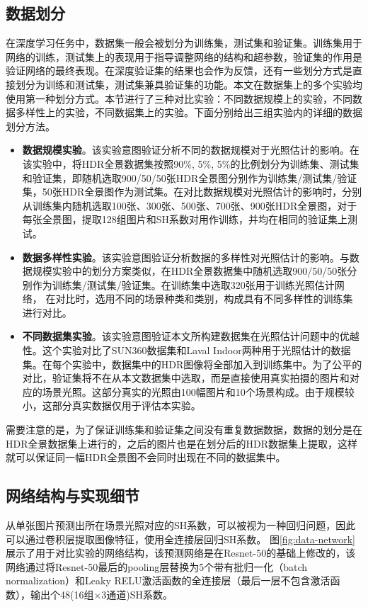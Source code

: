 \subsection{数据划分}
在深度学习任务中，数据集一般会被划分为训练集，测试集和验证集。训练集用于网络的训练，测试集上的表现用于指导调整网络的结构和超参数，验证集的作用是验证网络的最终表现。在深度验证集的结果也会作为反馈，还有一些划分方式是直接划分为训练和测试集，测试集兼具验证集的功能。本文在数据集上的多个实验均使用第一种划分方式。本节进行了三种对比实验：不同数据规模上的实验，不同数据多样性上的实验，不同数据集上的实验。下面分别给出三组实验内的详细的数据划分方法。
\begin{itemize}
    \item \textbf{数据规模实验}。该实验意图验证分析不同的数据规模对于光照估计的影响。在该实验中，将HDR全景数据集按照90\%, 5\%, 5\%的比例划分为训练集、测试集和验证集，即随机选取900/50/50张HDR全景图分别作为训练集/测试集/验证集，50张HDR全景图作为测试集。在对比数据规模对光照估计的影响时，分别从训练集内随机选取100张、300张、500张、700张、900张HDR全景图，对于每张全景图，提取128组图片和SH系数对用作训练，并均在相同的验证集上测试。
    \item \textbf{数据多样性实验}。该实验意图验证分析数据的多样性对光照估计的影响。与数据规模实验中的划分方案类似，在HDR全景数据集中随机选取900/50/50张分别作为训练集/测试集/验证集。在训练集中选取320张用于训练光照估计网络， 在对比时，选用不同的场景种类和类别，构成具有不同多样性的训练集进行对比。
    \item \textbf{不同数据集实验}。该实验意图验证本文所构建数据集在光照估计问题中的优越性。这个实验对比了SUN360\cite{xiao2012recognizing}数据集和Laval Indoor\cite{gardner2017learning}两种用于光照估计的数据集。在每个实验中，数据集中的HDR图像将全部加入到训练集中。为了公平的对比，验证集将不在从本文数据集中选取，而是直接使用真实拍摄的图片和对应的场景光照。这部分真实的光照由100幅图片和10个场景构成。由于规模较小，这部分真实数据仅用于评估本实验。
\end{itemize}

需要注意的是，为了保证训练集和验证集之间没有重复数据数据，数据的划分是在HDR全景数据集上进行的，之后的图片也是在划分后的HDR数据集上提取，这样就可以保证同一幅HDR全景图不会同时出现在不同的数据集中。
\subsection{网络结构与实现细节}
从单张图片预测出所在场景光照对应的SH系数，可以被视为一种回归问题，因此可以通过卷积层提取图像特征，使用全连接层回归SH系数。
图\ref{fig:data-network}展示了用于对比实验的网络结构，该预测网络是在Resnet-50\cite{he2016deep}的基础上修改的，该网络通过将Resnet-50最后的pooling层替换为5个带有批归一化（batch normalization）\cite{ioffe2015batch}和Leaky RELU激活函数\cite{maas2013rectifier}的全连接层（最后一层不包含激活函数），输出个48(16组$\times$3通道)SH系数。



